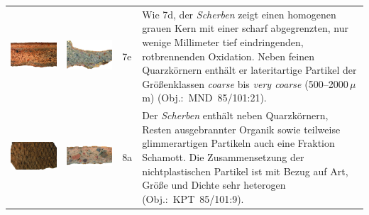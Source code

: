 \begin{footnotesize}
{\begin{longtable}{@{}m{}m{}m{}m{}@{}}
\includegraphics[width=.3\textwidth]{tbl/Tab_Fabrics/MND85-101-21_5cm.jpg} & \includegraphics[width=.3\textwidth]{tbl/Tab_Fabrics/MND85-101-21_2cm.jpg} & 7e & Wie 7d, der \textit{Scherben} zeigt einen homogenen grauen Kern mit einer scharf abgegrenzten, nur wenige Millimeter tief eindringenden, rotbrennenden Oxidation. Neben feinen Quarzkörnern enthält er lateritartige Partikel der Größenklassen \textit{coarse} bis \textit{very coarse} (500--2000\,$\mu$m) (Obj.:~MND~85/101:21).\vspace{1em} \\
\includegraphics[width=.3\textwidth]{tbl/Tab_Fabrics/KPT85-101-9_5cm.jpg} & \includegraphics[width=.3\textwidth]{tbl/Tab_Fabrics/KPT85-101-9_2cm.jpg} & 8a & Der \textit{Scherben} enthält neben Quarzkörnern, Resten ausgebrannter Organik sowie teilweise glimmerartigen Partikeln auch eine Fraktion Schamott. Die Zusammensetzung der nichtplastischen Partikel ist mit Bezug auf Art, Größe und Dichte sehr heterogen (Obj.:~KPT~85/101:9). \\[1em]

\end{longtable}}
\end{footnotesize}
